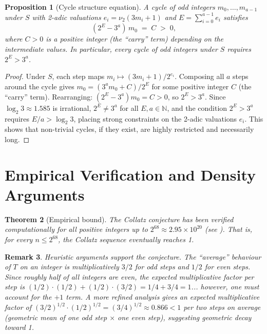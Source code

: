 \documentclass[12pt,a4paper]{article}
\newtheorem{theorem}{Theorem}[section]
\newtheorem{proposition}[theorem]{Proposition}
\newtheorem{remark}[theorem]{Remark}
\begin{document}
\begin{proposition}[Cycle structure equation]\label{prop:cycle_eq}
A cycle of odd integers $m_0, \ldots, m_{a-1}$ under $S$
with 2-adic valuations $e_i = \nu_2(3m_i + 1)$ and $E = \sum_{i=0}^{a-1} e_i$ satisfies
\begin{equation}\label{eq:cycle_cond}
  (2^E - 3^a)\, m_0 \;=\; C \;>\; 0,
\end{equation}
where $C > 0$ is a positive integer (the ``carry'' term) depending on the intermediate values.
In particular, every cycle of odd integers under $S$ requires $2^E > 3^a$.
\end{proposition}

\begin{proof}
Under $S$, each step maps $m_i \mapsto (3m_i + 1)/2^{e_i}$. Composing all $a$ steps around the
cycle gives $m_0 = (3^a m_0 + C) / 2^E$
for some positive integer $C$ (the ``carry'' term). Rearranging:
$(2^E - 3^a) m_0 = C > 0$,
so $2^E > 3^a$. Since $\log_2 3 \approx 1.585$ is irrational, $2^E \neq 3^a$ for all
$E, a \in \mathbb{N}$, and the condition $2^E > 3^a$ requires $E/a > \log_2 3$,
placing strong constraints on the 2-adic valuations $e_i$. This shows that non-trivial
cycles, if they exist, are highly restricted and necessarily long.
\end{proof}

\section{Empirical Verification and Density Arguments}

\begin{theorem}[Empirical bound]\label{thm:empirical}
The Collatz conjecture has been verified computationally for all positive integers up to
$2^{68} \approx 2.95 \times 10^{20}$
(see \cite{Barina2020}). That is, for every $n \leq 2^{68}$, the Collatz sequence
eventually reaches 1.
\end{theorem}

\begin{remark}\label{rem:heuristics}
Heuristic arguments support the conjecture. The ``average'' behaviour of $T$ on an integer
is multiplicatively $3/2$ for odd steps and $1/2$ for even steps. Since roughly half of
all integers are even, the expected multiplicative factor per step is
$(1/2) \cdot (1/2) + (1/2) \cdot (3/2) = 1/4 + 3/4 = 1$... however, one must account
for the $+1$ term. A more refined analysis gives an expected multiplicative factor of
$(3/2)^{1/2} \cdot (1/2)^{1/2} = (3/4)^{1/2} \approx 0.866 < 1$
per two steps on average (geometric mean of one odd step $\times$ one even step),
suggesting geometric decay toward 1.
\end{remark}
\end{document}
